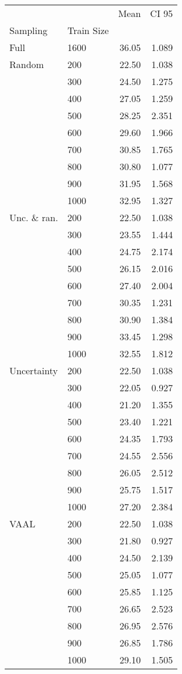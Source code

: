 \begin{tabular}{llrr}
\toprule
     &      &   Mean &  CI 95 \\
Sampling & Train Size &        &        \\
\midrule
Full & 1600 &  36.05 &  1.089 \\
Random & 200  &  22.50 &  1.038 \\
     & 300  &  24.50 &  1.275 \\
     & 400  &  27.05 &  1.259 \\
     & 500  &  28.25 &  2.351 \\
     & 600  &  29.60 &  1.966 \\
     & 700  &  30.85 &  1.765 \\
     & 800  &  30.80 &  1.077 \\
     & 900  &  31.95 &  1.568 \\
     & 1000 &  32.95 &  1.327 \\
Unc. \& ran. & 200  &  22.50 &  1.038 \\
     & 300  &  23.55 &  1.444 \\
     & 400  &  24.75 &  2.174 \\
     & 500  &  26.15 &  2.016 \\
     & 600  &  27.40 &  2.004 \\
     & 700  &  30.35 &  1.231 \\
     & 800  &  30.90 &  1.384 \\
     & 900  &  33.45 &  1.298 \\
     & 1000 &  32.55 &  1.812 \\
Uncertainty & 200  &  22.50 &  1.038 \\
     & 300  &  22.05 &  0.927 \\
     & 400  &  21.20 &  1.355 \\
     & 500  &  23.40 &  1.221 \\
     & 600  &  24.35 &  1.793 \\
     & 700  &  24.55 &  2.556 \\
     & 800  &  26.05 &  2.512 \\
     & 900  &  25.75 &  1.517 \\
     & 1000 &  27.20 &  2.384 \\
VAAL & 200  &  22.50 &  1.038 \\
     & 300  &  21.80 &  0.927 \\
     & 400  &  24.50 &  2.139 \\
     & 500  &  25.05 &  1.077 \\
     & 600  &  25.85 &  1.125 \\
     & 700  &  26.65 &  2.523 \\
     & 800  &  26.95 &  2.576 \\
     & 900  &  26.85 &  1.786 \\
     & 1000 &  29.10 &  1.505 \\
\bottomrule
\end{tabular}
